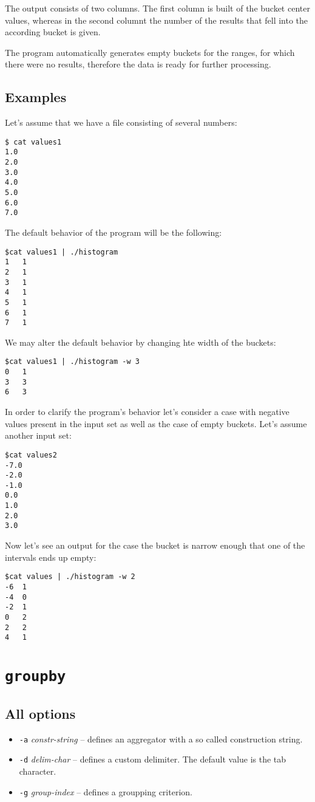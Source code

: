 \documentclass{report}
\begin{document}
The output consists of two columns. The first column is built of the bucket
center values, whereas in the second columnt the number of the results that
fell into the according bucket is given.

The program automatically generates empty buckets for the ranges, for which
there were no results, therefore the data is ready for further processing.

\subsection{Examples}
Let's assume that we have a file consisting of several numbers:
\begin{verbatim}
$ cat values1
1.0
2.0
3.0
4.0
5.0
6.0
7.0
\end{verbatim}

The default behavior of the program will be the following:
\begin{verbatim}
$cat values1 | ./histogram
1	1
2	1
3	1
4	1
5	1
6	1
7	1
\end{verbatim}

We may alter the default behavior by changing hte width of the buckets:
\begin{verbatim}
$cat values1 | ./histogram -w 3
0	1
3	3
6	3
\end{verbatim}

In order to clarify the program's behavior let's consider a case with negative values
present in the input set as well as the case of empty buckets. Let's assume another
input set:
\begin{verbatim}
$cat values2
-7.0
-2.0
-1.0
0.0
1.0
2.0
3.0
\end{verbatim}

Now let's see an output for the case the bucket is narrow enough that one of the
intervals ends up empty:
\begin{verbatim}
$cat values | ./histogram -w 2
-6	1
-4	0
-2	1
0	2
2	2
4	1
\end{verbatim}

\section{\texttt{groupby}}

\subsection{All options}
\begin{itemize}
	\item \texttt{-a} \textit{constr-string} -- defines an aggregator with a
		so called construction string.
	\item \texttt{-d} \textit{delim-char} -- defines a custom delimiter.
		The default value is the tab character.
	\item \texttt{-g} \textit{group-index} -- defines a groupping criterion.
\end{itemize}
\end{document}
